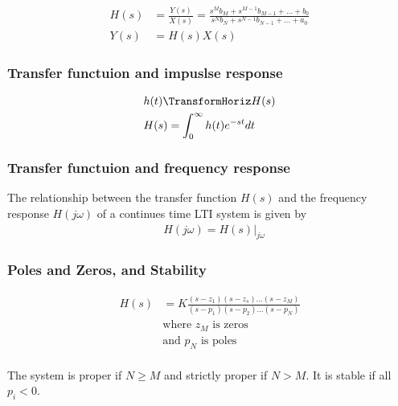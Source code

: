 
\begin{align*}
    H(s) &= \frac{Y(s)}{X(s)}=\frac{s^{M}b_M + s^{M-1}b_{M-1} + \ldots + b_0}{s^{N}b_N + s^{N-1}b_{N-1} + \ldots + a_0} \\
    Y(s) &= H(s)X(s)
\end{align*}

\subsubsection{Transfer functuion and impuslse response}
\begin{align*}
    &h(t) \TransformHoriz H(s) \\
    &H(s) = \int_{0}^{\infty} h(t)e^{-st}dt
\end{align*}

\subsubsection{Transfer functuion and frequency response}
The relationship between the transfer function $H(s)$ and the frequency response 
$H(j\omega)$ of a continues time LTI system is given by 
\begin{align*}
    &H(j\omega) = H(s)|_{j\omega}
\end{align*}

\subsubsection{Poles and Zeros, and Stability}

\begin{align*}
    H(s) &= K\frac{(s-z_1)(s-z_s)\ldots(s-z_M)}{(s-p_1)(s-p_2)\ldots(s-p_N)} \\
    &\text{where $z_M$ is zeros} \\
    &\text{and $p_N$ is poles} \\
\end{align*}

The system is proper if $N\geq M$ and strictly proper if $N>M$. 
It is stable if all $p_i<0$.  \newline

